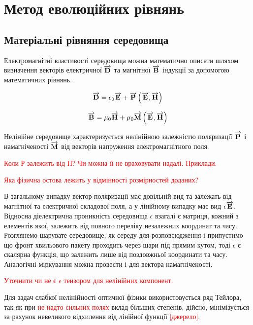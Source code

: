 \chapter{Метод еволюційних рівнянь}
\label{ch:evolution}

\section{Матеріальні рівняння середовища}

Електромагнітні властивості середовища можна математично описати шляхом
визначення векторів електричної $ \overrightarrow{\mathbf D} $ та магнітної $ \overrightarrow{\mathbf B} $ 
індукції за допомогою математичних рівнянь.

\begin{equation} \label{eq:MInduct}
\overrightarrow{\mathbf D} = \epsilon_0 \overrightarrow{\mathbf E} + \overrightarrow{\mathbf P} \left( \overrightarrow{\mathbf E},\overrightarrow{\mathbf H} \right)
\end{equation}

\begin{equation} \label{eq:EInduct} 
\overrightarrow{\mathbf B} = \mu_0 \overrightarrow{\mathbf H} + \mu_0 \overrightarrow{\mathbf M} \left( \overrightarrow{\mathbf E},\overrightarrow{\mathbf H} \right)
\end{equation}

Нелінійне середовище характеризується нелінійною залежністю поляризації
$ \overrightarrow{\mathbf P} $ і намагніченості $ \overrightarrow{\mathbf M} $ від векторів напруження 
електромагнітного поля. 

\textcolor{red}{Коли Р залежить від Н? Чи можна її не враховувати 
надалі. Приклади.}

\textcolor{red}{Яка фізична остова лежить у відмінності розмірностей доданих?}

В загальному випадку вектор поляризації має довільній вид та залежать від 
магнітної та електричної складової поля, а у лінійному випадку має вид
$ \epsilon \overrightarrow{\mathbf E} $. Відносна діелектрична проникність середовища 
$ \epsilon $ взагалі є матриця, кожний з елементів якої, залежить від 
повного переліку незалежних координат та часу. Розглянемо шарувате середовище, 
як середу для розповсюдження і припустимо що фронт хвильового пакету проходить 
через шари під прямим кутом, тоді $ \epsilon $ є скалярна функція, що залежить 
лише від поздовжньої координати та часу. Аналогічні міркування можна провести 
і для вектора намагніченості.

\textcolor{red}{Уточнити чи не є $ \epsilon $ тензором для нелінійних 
компонент.}

Для задач слабкої нелінійності оптичної фізики використовується ряд Тейлора, 
так як при \textcolor{red}{не надто сильних полях} вклад більших степенів,
дійсно, мінімізується за рахунок невеликого відхилення від лінійної
функції \textcolor{red}{[джерело]}.

